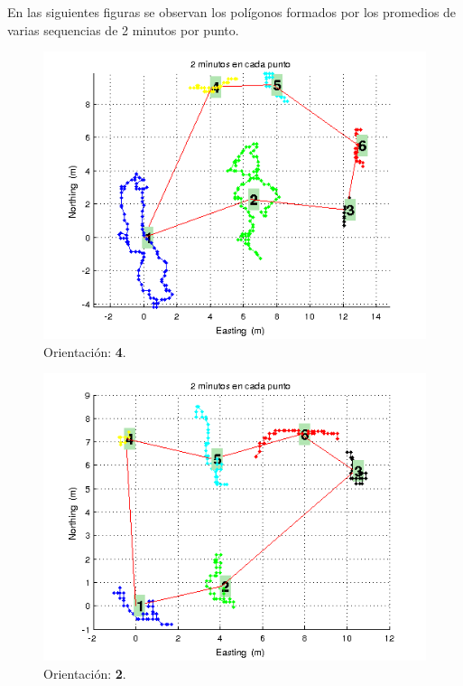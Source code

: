 \documentclass[spanish,12pt,a4paper,titlepage]{report}
\begin{document}
En las siguientes figuras se observan los polígonos formados por los promedios de varias sequencias de 2 minutos por punto. 

\newpage
\begin{figure}[h!]
  \includegraphics[width=.9\textwidth]{./img/2m_or1_pol.png}
  \caption{Orientación: \textbf{4}.}
\vspace{-30pt}
  \label{fig:2m_or1_pol.png}
\end{figure}

\begin{figure}[h!]
  \includegraphics[width=1\textwidth]{./img/2m_or2_pol.png}
  \caption{Orientación: \textbf{2}.}
  \label{fig:2m_or2_pol.png}
\end{figure}
\end{document}
